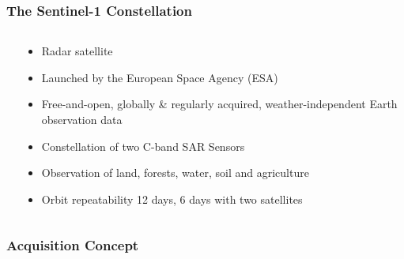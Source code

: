 \documentclass[aspectratio=1610,10pt]{beamer}
\begin{document}
\begin{frame} \frametitle{\large{The Sentinel-1 Constellation }}\vspace{-0.4cm}

 \justifying
\begin{columns}[T,onlytextwidth]
    \begin{column}{.49\textwidth}
    \end{column}
\begin{column}{.40\textwidth}\vspace{-1.0cm}
  \begin{block}{} \vspace{-0.8cm}
		\justifying
				\end{block}%
				\begin{itemize}
				\item Radar satellite
					\item Launched by the European Space Agency (ESA)
					\item Free-and-open, globally \& regularly acquired, weather-independent Earth observation data
					\item Constellation of two C-band SAR Sensors
					\item Observation of land, forests, water, soil and agriculture
					\item Orbit repeatability 12 days, 6 days with two satellites

				\end{itemize}
    \end{column}
\end{columns}\vspace{0.2cm}
\end{frame} 

		\begin{frame} \frametitle{\large{Acquisition Concept }}%
\begin{center}
	\end{center}
\end{frame} 
\end{document}
